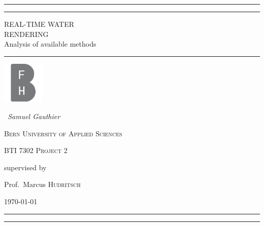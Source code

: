 \begin{titlepage}
	\centering

    \rule{0.9\textwidth}{1pt} 

	\vspace{2pt}\vspace{-\baselineskip}

	\rule{0.9\textwidth}{0.4pt}

	\vspace{0.1\textheight}

    \textcolor[rgb]{0.78,0,0}{
    {\Huge REAL-TIME WATER}\\[0.5\baselineskip]
    {\Huge RENDERING}\\[1.7\baselineskip]
    {\Large Analysis of available methods}\\
    }%

    \vspace{0.025\textheight}
    \rule{0.3\textwidth}{0.4pt}

    \vspace{2cm}
    \includegraphics[width=0.15\textwidth]{figures/BFH_Logo_BW.pdf}\par\vspace{1cm}
    \vspace{1cm}
    {\Large\itshape~Samuel Gauthier\par}{}
    \vspace{0.5cm}
    {\scshape Bern University of Applied Sciences\par}
	{\scshape\Large BTI 7302 Project 2\par}

	\vspace{1cm}
	supervised by\par
	Prof.~Marcus \textsc{Hudritsch}
    \vspace{1cm}
	\vfill

    {\large \today\par}%
    \vfill

    \rule{0.9\textwidth}{0.4pt}

	\vspace{2pt}\vspace{-\baselineskip}

	\rule{0.9\textwidth}{1pt}

\end{titlepage}
\restoregeometry{}

